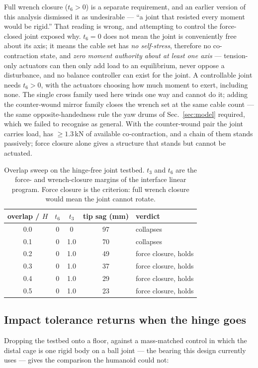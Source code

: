 \documentclass[conference]{IEEEtran}
\begin{document}
Full wrench closure ($t_6>0$) is a separate requirement, and an earlier
version of this analysis dismissed it as undesirable --- ``a joint that
resisted every moment would be rigid.'' That reading is wrong, and attempting
to control the force-closed joint exposed why. $t_6=0$ does not mean the
joint is conveniently free about its axis; it means the cable set has
\emph{no self-stress}, therefore no co-contraction state, and \emph{zero
moment authority about at least one axis} --- tension-only actuators can then
only add load to an equilibrium, never oppose a disturbance, and no balance
controller can exist for the joint. A controllable joint needs $t_6>0$, with
the actuators choosing how much moment to exert, including none. The single
cross family used here winds one way and cannot do it; adding the
counter-wound mirror family closes the wrench set at the same cable count ---
the same opposite-handedness rule the yaw drums of Sec.~\ref{sec:model}
required, which we failed to recognise as general. With the counter-wound
pair the joint carries load, has $\ge1.3$\,kN of available co-contraction,
and a chain of them stands passively; force closure alone gives a structure
that stands but cannot be actuated.

\begin{table}[tb]
\centering
\caption{Overlap sweep on the hinge-free joint testbed. $t_3$ and $t_6$ are
the force- and wrench-closure margins of the interface linear program. Force
closure is the criterion: full wrench closure would mean the joint cannot
rotate.}
\label{tab:jointcell}
\begin{tabular}{@{}ccccl@{}}
\toprule
overlap / $H$ & $t_6$ & $t_3$ & tip sag (mm) & verdict\\
\midrule
0.0 & 0 & 0 & 97 & collapses\\
0.1 & 0 & 1.0 & 70 & collapses\\
0.2 & 0 & 1.0 & 49 & force closure, holds\\
0.3 & 0 & 1.0 & 37 & force closure, holds\\
0.4 & 0 & 1.0 & 29 & force closure, holds\\
0.5 & 0 & 1.0 & 23 & force closure, holds\\
\bottomrule
\end{tabular}
\end{table}

\subsection{Impact tolerance returns when the hinge goes}
\label{sec:jointimpact}
Dropping the testbed onto a floor, against a mass-matched control in which the
distal cage is one rigid body on a ball joint --- the bearing this design
currently uses --- gives the comparison the humanoid could not:
\end{document}
